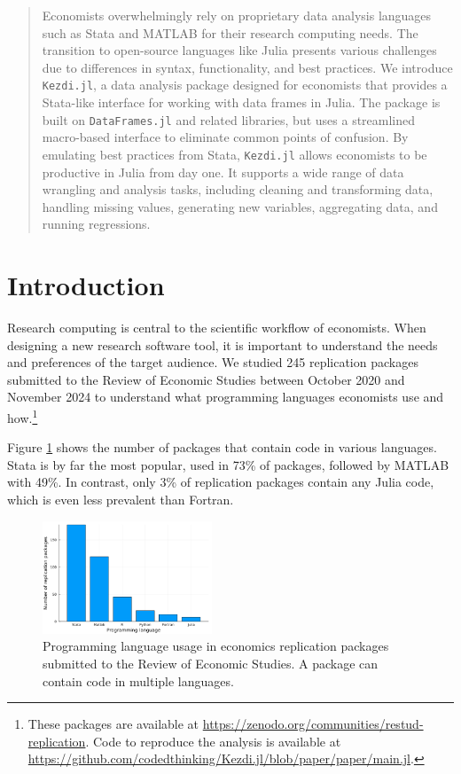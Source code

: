 \documentclass{juliacon}
\begin{document}

\maketitle

\begin{abstract}
Economists overwhelmingly rely on proprietary data analysis languages such as Stata and MATLAB for their research computing needs. The transition to open-source languages like Julia presents various challenges due to differences in syntax, functionality, and best practices. We introduce \texttt{Kezdi.jl}, a data analysis package designed for economists that provides a Stata-like interface for working with data frames in Julia. The package is built on \texttt{DataFrames.jl} and related libraries, but uses a streamlined macro-based interface to eliminate common points of confusion. By emulating best practices from Stata, \texttt{Kezdi.jl} allows economists to be productive in Julia from day one. It supports a wide range of data wrangling and analysis tasks, including cleaning and transforming data, handling missing values, generating new variables, aggregating data, and running regressions.
\end{abstract}

\section{Introduction}

Research computing is central to the scientific workflow of economists. When designing a new research software tool, it is important to understand the needs and preferences of the target audience. We studied 245 replication packages submitted to the Review of Economic Studies between October 2020 and November 2024 to understand what programming languages economists use and how.\footnote{These packages are available at \url{https://zenodo.org/communities/restud-replication}. Code to reproduce the analysis is available at \url{https://github.com/codedthinking/Kezdi.jl/blob/paper/paper/main.jl}.}

Figure \ref{fig:languages} shows the number of packages that contain code in various languages. Stata is by far the most popular, used in 73\% of packages, followed by MATLAB with 49\%. In contrast, only 3\% of replication packages contain any Julia code, which is even less prevalent than Fortran.

\begin{figure}[h]
\centering
\includegraphics[width=0.45\textwidth]{languages.png}
\caption{Programming language usage in economics replication packages submitted to the Review of Economic Studies. A package can contain code in multiple languages.}
\label{fig:languages}
\end{figure}
\end{document}
